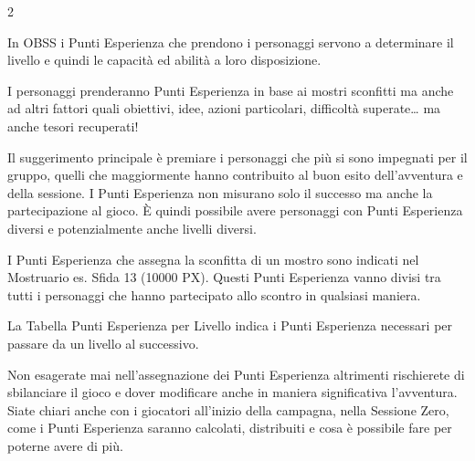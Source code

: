 \begin{multicols}{2}
\label{punti-esperienza}

In OBSS i Punti Esperienza che prendono i personaggi servono a determinare il livello e quindi le capacità ed abilità a loro disposizione.

I personaggi prenderanno Punti Esperienza in base ai mostri sconfitti ma anche ad altri fattori quali obiettivi, idee, azioni particolari, difficoltà superate… ma anche tesori recuperati!

Il suggerimento principale è premiare i personaggi che più si sono impegnati per il gruppo, quelli che maggiormente hanno contribuito al buon esito dell'avventura e della sessione. I Punti Esperienza non misurano solo il successo ma anche la partecipazione al gioco.
È quindi possibile avere personaggi con Punti Esperienza diversi e potenzialmente anche livelli diversi.

I Punti Esperienza che assegna la sconfitta di un mostro sono indicati nel Mostruario es. Sfida 13 (10000 PX). Questi Punti Esperienza vanno divisi tra tutti i personaggi che hanno partecipato allo scontro in qualsiasi maniera.

La Tabella Punti Esperienza per Livello indica i Punti Esperienza necessari per passare da un livello al successivo.

Non esagerate mai nell'assegnazione dei Punti Esperienza altrimenti rischierete di sbilanciare il gioco e dover modificare anche in maniera significativa l'avventura. Siate chiari anche con i giocatori all'inizio della campagna, nella Sessione Zero, come i Punti Esperienza saranno calcolati, distribuiti e cosa è possibile fare per poterne avere di più.



\end{multicols}
